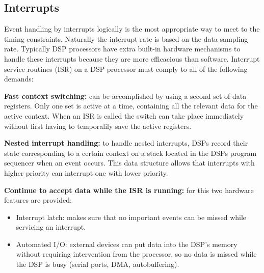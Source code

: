 \subsection{Interrupts}
Event handling by interrupts logically is the most appropriate way to meet to the timing constraints. Naturally the interrupt rate is based on the data sampling rate. Typically DSP processors have extra built-in hardware mechanisms to handle these interrupts because they are more efficacious than software. Interrupt service routines (ISR) on a DSP processor must comply to all of the following demands:
\begin{description}
\item \textbf{Fast context switching:} can be accomplished by using a second set of data registers. Only one set is active at a time, containing all the relevant data for the active context. When an ISR is called the switch can take place immediately without first having to temporalily save the active registers. 
\item \textbf{Nested interrupt handling:} to handle nested interrupts, DSPs record their state corresponding to a certain context on a stack located in the DSPs program sequencer when an event occurs. This data structure allows that interrupts with higher priority can interrupt one with lower priority.
\item \textbf{Continue to accept data while the ISR is running:} for this two hardware features are provided: 
\begin{itemize} 
\item Interrupt latch: makes sure that no important events can be missed while servicing an interrupt.
\item Automated I/O: external devices can put data into the DSP's memory without requiring intervention from the processor, so no data is missed while the DSP is busy (serial ports, DMA, autobuffering).
\end{itemize}
\end{description}
